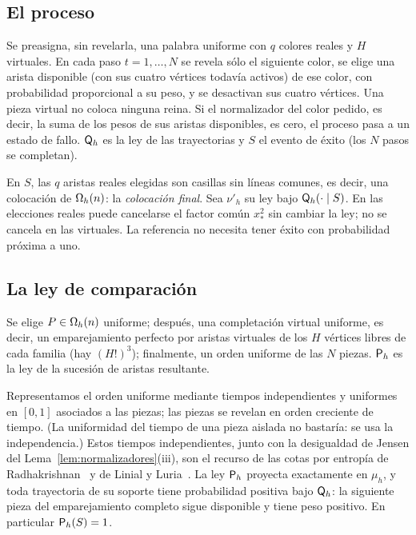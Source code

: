 \subsection{El proceso}

\begin{definicion}\label{def:referencia}
Se preasigna, sin revelarla, una palabra uniforme con $q$ colores reales y $H$ virtuales. En
cada paso $t=1,\dots,N$ se revela sólo el siguiente color, se elige una arista disponible (con
sus cuatro vértices todavía activos) de ese color, con probabilidad proporcional a su peso, y se
desactivan sus cuatro vértices. Una pieza virtual no coloca ninguna reina. Si el normalizador
del color pedido, es decir, la suma de los pesos de sus aristas disponibles, es cero, el proceso pasa a un
estado de fallo. $\mathsf{Q}_h$ es la ley de las
trayectorias y $S$ el evento de éxito (los $N$ pasos se completan).
\end{definicion}

En $S$, las $q$ aristas reales elegidas son casillas sin líneas comunes, es decir, una
colocación de $\Omega_h(n)$: la \emph{colocación final}. Sea $\nu'_h$ su ley bajo
$\mathsf{Q}_h(\cdot\mid S)$. En las elecciones reales puede cancelarse el factor común $x_*^2$ sin
cambiar la ley; no se cancela en las virtuales. La referencia no necesita tener éxito con
probabilidad próxima a uno.

\subsection{La ley de comparación}

\begin{definicion}\label{def:comparacion}
Se elige $P\in\Omega_h(n)$ uniforme; después, una completación virtual uniforme, es decir, un
emparejamiento perfecto por aristas virtuales de los $H$ vértices libres de cada familia (hay
$(H!)^3$); finalmente, un orden uniforme de las $N$ piezas. $\mathsf{P}_h$ es la ley de la sucesión de
aristas resultante.
\end{definicion}

Representamos el orden uniforme mediante tiempos independientes y uniformes en $[0,1]$
asociados a las piezas; las piezas se revelan en orden creciente de tiempo. (La uniformidad del
tiempo de una pieza aislada no bastaría: se usa la independencia.) Estos tiempos independientes,
junto con la desigualdad de Jensen del Lema~\ref{lem:normalizadores}(iii), son el recurso de las
cotas por entropía de Radhakrishnan~\cite{Radhakrishnan} y de Linial y Luria~\cite{LinialLuria}.
La ley $\mathsf{P}_h$ proyecta
exactamente en $\mu_h$, y toda trayectoria de su soporte tiene probabilidad positiva bajo
$\mathsf{Q}_h$: la siguiente pieza del emparejamiento completo sigue disponible y tiene peso positivo.
En particular $\mathsf{P}_h(S)=1$.

